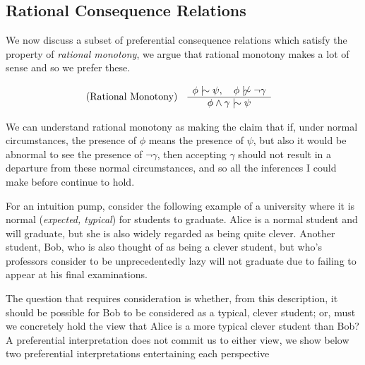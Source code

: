 \subsection{Rational Consequence Relations}
\label{subseciton:rational-consequence-relations}

We now discuss a subset of preferential consequence relations which satisfy the property of \textit{rational monotony},
we argue that rational monotony makes a lot of sense and so we prefer these.

\begin{align}
	\inferLeft{Rational Monotony}{\phi \twiddle \psi, \quad \phi \ntwiddle \neg \gamma}{\phi \land \gamma \twiddle \psi}
\end{align}

We can understand rational monotony as making the claim that if, under normal circumstances, the presence of $\phi$ means
the presence of $\psi$, but also it would be abnormal to see the presence of $\neg \gamma$, then accepting $\gamma$ should
not result in a departure from these normal circumstances, and so all the inferences I could make before continue to
hold.

For an intuition pump, consider the following example of a university where it is normal (\textit{expected, typical})
for students to graduate. Alice is a normal student and will graduate, but she is also widely regarded as being quite
clever. Another student, Bob, who is also thought of as being a clever student, but who's professors consider to be
unprecedentedly lazy will not graduate due to failing to appear at his final examinations.

The question that requires consideration is whether, from this description, it should be possible for Bob to be
considered as a typical, clever student; or, must we concretely hold the view that Alice is a more typical clever student
than Bob? A preferential interpretation does not commit us to either view, we show below two preferential interpretations
entertaining each perspective

